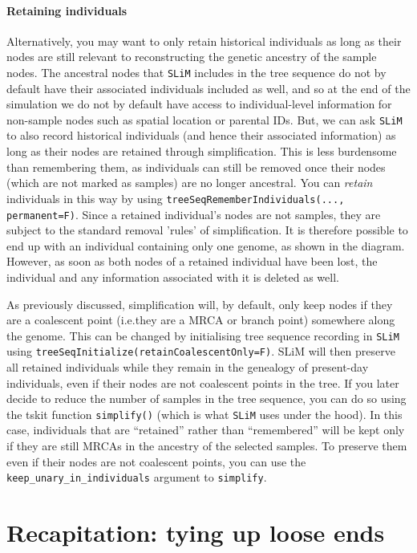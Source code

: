 \documentclass[12pt]{article}
\newcommand{\slim}[0]{\texttt{SLiM}\xspace}
\newcommand*{\ie}{i.e.\xcomma}
\begin{document}
\paragraph{Retaining individuals}
Alternatively, you may want to only retain historical individuals as long as their nodes are still
relevant to reconstructing the genetic ancestry of the sample nodes.
The ancestral nodes that \slim includes in the tree sequence do not by default have their associated individuals included as well,
and so at the end of the simulation we do not by default have access to individual-level information for non-sample nodes
such as spatial location or parental IDs.
But, we can ask \slim to also record historical individuals (and hence their associated information)
as long as their nodes are retained through simplification.
This is less burdensome than remembering them, as individuals can still be removed once their
nodes (which are not marked as samples) are no longer ancestral.
You can \emph{retain} individuals in this way by using
\verb|treeSeqRememberIndividuals(..., permanent=F)|.
Since a retained individual's nodes are not samples,
they are subject to the standard removal 'rules' of simplification.
It is therefore possible to end up with an individual containing only one genome, as shown in the diagram.
However, as soon as both nodes of a retained individual have been lost,
the individual and any information associated with it is deleted as well.

As previously discussed, simplification will, by default, only keep nodes if they are a coalescent point
(\ie they are a MRCA or branch point) somewhere along the genome.
This can be changed by initialising tree sequence recording in \slim using
\verb|treeSeqInitialize(retainCoalescentOnly=F)|.
SLiM will then preserve all retained individuals while they remain in the genealogy of present-day individuals,
even if their nodes are not coalescent points in the tree.
If you later decide to reduce the number
of samples in the tree sequence, you can do so using the tskit function \verb|simplify()|
(which is what \slim uses under the hood).
In this case, individuals that are ``retained'' rather than ``remembered'' will be kept only
if they are still MRCAs in the ancestry of the selected samples.
To preserve them even if their nodes are not coalescent points,
you can use the \verb|keep_unary_in_individuals| argument to \verb|simplify|.

\section{Recapitation: tying up loose ends} %
\end{document}
